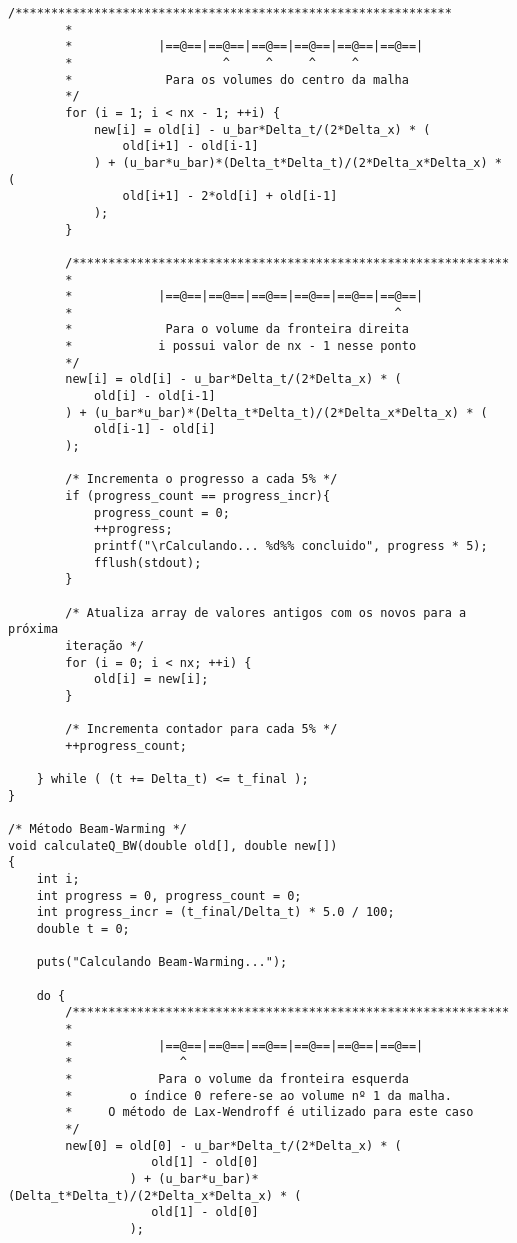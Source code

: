 \begin{Verbatim}[fontsize=\footnotesize]
        /*************************************************************
        *
        *            |==@==|==@==|==@==|==@==|==@==|==@==|
        *                     ^     ^     ^     ^
        *             Para os volumes do centro da malha
        */
        for (i = 1; i < nx - 1; ++i) {
            new[i] = old[i] - u_bar*Delta_t/(2*Delta_x) * (
                old[i+1] - old[i-1]
            ) + (u_bar*u_bar)*(Delta_t*Delta_t)/(2*Delta_x*Delta_x) * (
                old[i+1] - 2*old[i] + old[i-1]
            );
        }

        /*************************************************************
        *
        *            |==@==|==@==|==@==|==@==|==@==|==@==|
        *                                             ^
        *             Para o volume da fronteira direita
        *            i possui valor de nx - 1 nesse ponto
        */
        new[i] = old[i] - u_bar*Delta_t/(2*Delta_x) * (
            old[i] - old[i-1]
        ) + (u_bar*u_bar)*(Delta_t*Delta_t)/(2*Delta_x*Delta_x) * (
            old[i-1] - old[i]
        );

        /* Incrementa o progresso a cada 5% */
        if (progress_count == progress_incr){
            progress_count = 0;
            ++progress;
            printf("\rCalculando... %d%% concluido", progress * 5);
            fflush(stdout);
        }

        /* Atualiza array de valores antigos com os novos para a próxima
        iteração */
        for (i = 0; i < nx; ++i) {
            old[i] = new[i];
        }

        /* Incrementa contador para cada 5% */
        ++progress_count;

    } while ( (t += Delta_t) <= t_final );
}

/* Método Beam-Warming */
void calculateQ_BW(double old[], double new[])
{
    int i;
    int progress = 0, progress_count = 0;
    int progress_incr = (t_final/Delta_t) * 5.0 / 100;
    double t = 0;

    puts("Calculando Beam-Warming...");

    do {
        /*************************************************************
        *
        *            |==@==|==@==|==@==|==@==|==@==|==@==|
        *               ^
        *            Para o volume da fronteira esquerda
        *        o índice 0 refere-se ao volume nº 1 da malha.
        *     O método de Lax-Wendroff é utilizado para este caso
        */
        new[0] = old[0] - u_bar*Delta_t/(2*Delta_x) * (
                    old[1] - old[0]
                 ) + (u_bar*u_bar)*(Delta_t*Delta_t)/(2*Delta_x*Delta_x) * (
                    old[1] - old[0]
                 );


\end{Verbatim}
